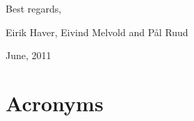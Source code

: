 \documentclass[pdftex,english,10pt,b5paper,twoside]{book}
\begin{document}
\vspace{13pt}

Best regards,
\begin{center}
Eirik Haver, Eivind Melvold and Pål Ruud
\vspace{13pt}

June, 2011

\end{center}

\tableofcontents

\cleardoublepage
{}
{}
\listoffigures

\cleardoublepage
{}
{}
\listoftables

\cleardoublepage
{}
{}
\lstlistoflistings
\cleardoublepage

\chapter*{Acronyms}
\end{document}
